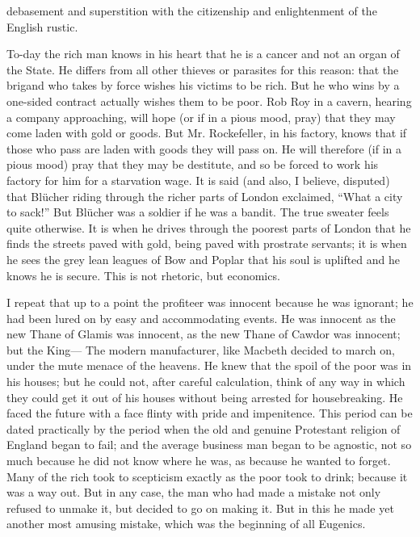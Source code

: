 \documentclass{book}
\begin{document}
debasement and superstition with the citizenship and enlightenment of the English rustic.

To-day the rich man knows in his heart that he is a cancer and not an organ of the State. He differs from all other thieves or parasites for this reason: that the brigand who takes by force wishes his victims to be rich. But he who wins by a one-sided contract actually wishes them to be poor. Rob Roy in a cavern, hearing a company approaching, will hope (or if in a pious mood, pray) that they may come laden with gold or goods. But Mr. Rockefeller, in his factory, knows that if those who pass are laden with goods they will pass on. He will therefore (if in a pious mood) pray that they may be destitute, and so be forced to work his factory for him for a starvation wage. It is said (and also, I believe, disputed) that Blücher riding through the richer parts of London exclaimed, “What a city to sack!” But Blücher was a soldier if he was a bandit. The true sweater feels quite otherwise. It is when he drives through the poorest parts of London that he finds the streets paved with gold, being paved with prostrate servants; it is when he sees the grey lean leagues of Bow and Poplar that his soul is uplifted and he knows he is secure. This is not rhetoric, but economics.

I repeat that up to a point the profiteer was innocent because he was ignorant; he had been lured on by easy and accommodating events. He was innocent as the new Thane of Glamis was innocent, as the new Thane of Cawdor was innocent; but the King— The modern manufacturer, like Macbeth decided to march on, under the mute menace of the heavens. He knew that the spoil of the poor was in his houses; but he could not, after careful calculation, think of any way in which they could get it out of his houses without being arrested for housebreaking. He faced the future with a face flinty with pride and impenitence. This period can be dated practically by the period when the old and genuine Protestant religion of England began to fail; and the average business man began to be agnostic, not so much because he did not know where he was, as because he wanted to forget. Many of the rich took to scepticism exactly as the poor took to drink; because it was a way out. But in any case, the man who had made a mistake not only refused to unmake it, but decided to go on making it. But in this he made yet another most amusing mistake, which was the beginning of all Eugenics.
\end{document}
